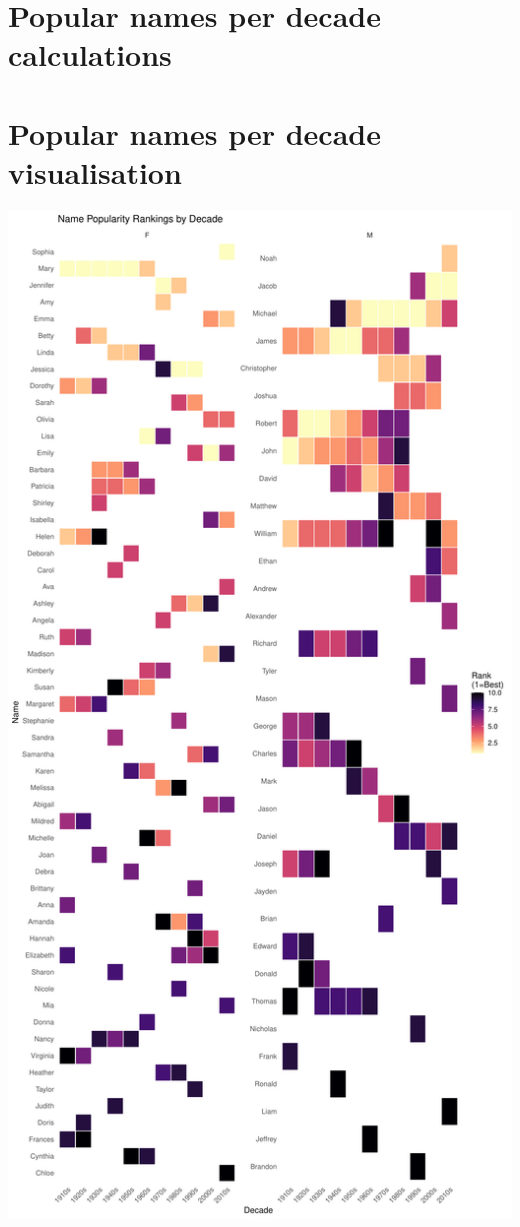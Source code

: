 \documentclass[11pt,preprint]{elsarticle}
\let\origfigure\figure
\let\endorigfigure\endfigure
\renewenvironment{figure}[1][2] {
    \expandafter\origfigure\expandafter[H]
} {
    \endorigfigure
}
\numberwithin{equation}{section}
\numberwithin{figure}{section}
\numberwithin{table}{section}
\begin{document}
\newpage

\section{Popular names per decade
calculations}\label{popular-names-per-decade-calculations}

\section{Popular names per decade
visualisation}\label{popular-names-per-decade-visualisation}

\begin{figure}[H]

{\centering \includegraphics{Question1_files/figure-latex/unnamed-chunk-4-1} 

}
\end{figure}
\end{document}
